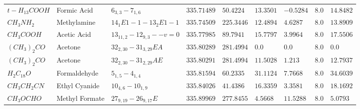 \documentclass{aa}
\begin{document}
\begin{table}
\begin{tabular}{l l l l l l l l l}
$t-H_{13}COOH$ & Formic Acid & $6_{3,3}-7_{1,6}$ & $335.71489$ & $50.4224$ & $13.3501$ & $-0.5284$ & $8.0$ & $14.8482$\\
$CH_{3}NH_{2}$ & Methylamine & $14_{1}E1-1-13_{2}E1-1$ & $335.74509$ & $225.3446$ & $12.4894$ & $4.6287$ & $8.0$ & $13.8909$\\
$CH_{3}COOH$ & Acetic Acid & $13_{11,2}-12_{9,3}--v=0$ & $335.77985$ & $89.7941$ & $15.7797$ & $3.9964$ & $8.0$ & $17.5506$\\
$(CH_{3})_{2}CO$ & Acetone & $32_{2,30}-31_{3,29}EA$ & $335.80289$ & $281.4994$ & $0.0$ & $0.0$ & $8.0$ & $0.0$\\
$(CH_{3})_{2}CO$ & Acetone & $32_{2,30}-31_{2,29}AE$ & $335.80291$ & $281.4994$ & $11.5028$ & $1.213$ & $8.0$ & $12.7937$\\
$H_{2}C_{18}O$ & Formaldehyde & $5_{1,5}-4_{1,4}$ & $335.81594$ & $60.2335$ & $31.1124$ & $7.7668$ & $8.0$ & $34.6039$\\
$CH_{3}CH_{2}CN$ & Ethyl Cyanide & $10_{4,6}-10_{1,9}$ & $335.84026$ & $41.4386$ & $16.3359$ & $3.3581$ & $8.0$ & $18.1692$\\
$CH_{3}OCHO$ & Methyl Formate & $27_{9,19}-26_{9,17}E$ & $335.89969$ & $277.8455$ & $4.5668$ & $11.5288$ & $8.0$ & $5.0793$\\
    \hline                  
    \end{tabular}
\end{table}
\end{document}
